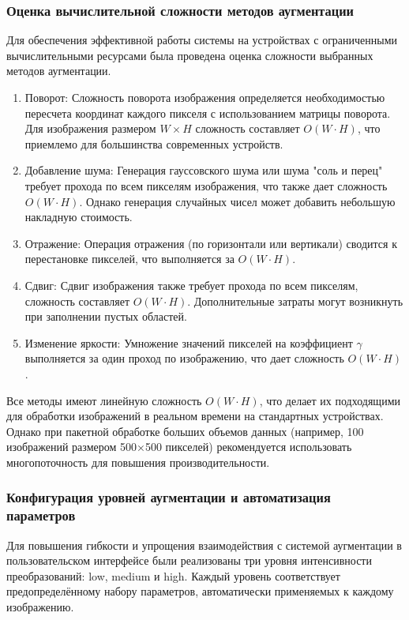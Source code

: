 
\subsubsection{Оценка вычислительной сложности методов аугментации}

Для обеспечения эффективной работы системы на устройствах с ограниченными вычислительными ресурсами была проведена оценка сложности выбранных методов аугментации. 

\begin{enumerate}
	\item Поворот: Сложность поворота изображения определяется необходимостью пересчета координат каждого пикселя с использованием матрицы поворота. Для изображения размером $W \times H$ сложность составляет $O(W \cdot H)$, что приемлемо для большинства современных устройств.
	\item Добавление шума: Генерация гауссовского шума или шума "соль и перец" требует прохода по всем пикселям изображения, что также дает сложность $O(W \cdot H)$. Однако генерация случайных чисел может добавить небольшую накладную стоимость.
	\item Отражение: Операция отражения (по горизонтали или вертикали) сводится к перестановке пикселей, что выполняется за $O(W \cdot H)$.
	\item Сдвиг: Сдвиг изображения также требует прохода по всем пикселям, сложность составляет $O(W \cdot H)$. Дополнительные затраты могут возникнуть при заполнении пустых областей.
	\item Изменение яркости: Умножение значений пикселей на коэффициент $\gamma$ выполняется за один проход по изображению, что дает сложность $O(W \cdot H)$.
\end{enumerate}

Все методы имеют линейную сложность $O(W \cdot H)$, что делает их подходящими для обработки изображений в реальном времени на стандартных устройствах. Однако при пакетной обработке больших объемов данных (например, 100 изображений размером 500×500 пикселей) рекомендуется использовать многопоточность для повышения производительности.

\subsubsection{Конфигурация уровней аугментации и автоматизация параметров}

Для повышения гибкости и упрощения взаимодействия с системой аугментации в пользовательском интерфейсе были реализованы три уровня интенсивности преобразований: low, medium и high. Каждый уровень соответствует предопределённому набору параметров, автоматически применяемых к каждому изображению.

